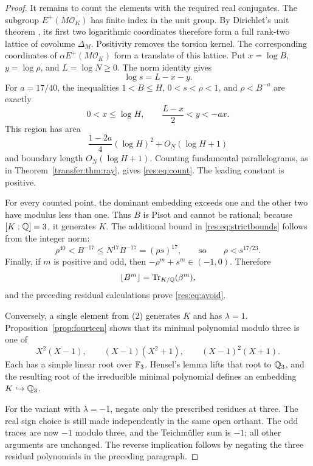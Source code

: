 \documentclass[11pt,a4paper]{article}
\theoremstyle{remark}\newtheorem{remark}[theorem]{Remark}
\newcommand{\Tr}{\operatorname{Tr}}\newcommand{\Nm}{\operatorname{N}}
\begin{document}
\begin{proof}
It remains to count the elements with the required real conjugates.
The subgroup $E^+(M\mathcal O_K)$ has finite index in the unit
group. By Dirichlet's unit theorem \cite[Chapter~5]{MilneANT},
its first two logarithmic coordinates therefore form a full
rank-two lattice of covolume $\Delta_M$. Positivity removes the
torsion kernel. The corresponding coordinates of
$\alpha E^+(M\mathcal O_K)$ form a translate of this lattice.
Put $x=\log B$, $y=\log\rho$, and $L=\log N\ge0$.
The norm identity gives
\[
 \log s=L-x-y.
\]
For $a=17/40$, the inequalities
$1<B\le H$, $0<s<\rho<1$, and $\rho<B^{-a}$ are exactly
\begin{equation}
\label{res:eq:triangle}
 0<x\le\log H,\qquad \frac{L-x}{2}<y<-ax.
\end{equation}
This region has area
\[
 \frac{1-2a}{4}(\log H)^2+O_N(\log H+1)
\]
and boundary length $O_N(\log H+1)$. Counting fundamental
parallelograms, as in Theorem~\ref{transfer:thm:ray}, gives
\eqref{res:eq:count}. The leading constant is positive.

For every counted point, the dominant embedding exceeds one and
the other two have modulus less than one. Thus $B$ is Pisot and
cannot be rational; because $[K:\mathbb Q]=3$, it generates $K$.
The additional bound in \eqref{res:eq:strictbounds} follows from
the integer norm:
\[
 \rho^{40}<B^{-17}\le N^{17}B^{-17}
     =(\rho s)^{17},
 \qquad\text{so}\qquad \rho<s^{17/23}.
\]
Finally, if $m$ is positive and odd, then
$-\rho^m+s^m\in(-1,0)$. Therefore
\[
 \lfloor B^m\rfloor=\Tr_{K/\Q}(\beta^m),
\]
and the preceding residual calculations prove \eqref{res:eq:avoid}.

Conversely, a single element from (2) generates $K$ and has
$\lambda=1$. Proposition~\ref{prop:fourteen} shows that its
minimal polynomial modulo three is one of
\[
 X^2(X-1),\qquad (X-1)(X^2+1),\qquad (X-1)^2(X+1).
\]
Each has a simple linear root over $\mathbb F_3$. Hensel's lemma lifts
that root to $\mathbb Q_3$, and the resulting root of the irreducible
minimal polynomial defines an embedding $K\hookrightarrow\mathbb Q_3$.

For the variant with $\lambda=-1$, negate only the prescribed
residues at three. The real sign choice is still made independently
in the same open orthant. The odd traces are now $-1$ modulo three,
and the Teichm\"uller sum is $-1$; all other arguments are unchanged.
The reverse implication follows by negating the three residual
polynomials in the preceding paragraph.
\end{proof}
\end{document}
